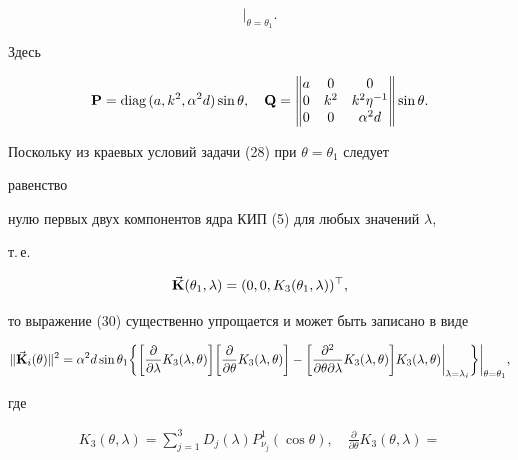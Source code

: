 \begin{exam}
\begin{equation}
\bigg|_{\theta=\theta_1}. 


\end{equation} 


Здесь 


$$ 


\bold P=\text{diag\,}(a,k^2,\alpha^2d)\sin\theta,\quad 


\bold Q= 


\begin{Vmatrix} 


a & 0 & 0 \\ 0 & k^2 & k^2\eta^{-1} \\ 0 & 0 & \alpha^2d 


\end{Vmatrix} 


\sin\theta. 


$$ 


Поскольку из краевых условий задачи (28) при $\theta=\theta_1$ следует 


равенство 


нулю первых двух компонентов ядра КИП (5) для любых значений $\lambda$, 


т.\,е. 


$$


\vb{K}(\theta_1,\lambda)=(0,0,K_3(\theta_1,\lambda))^\top, 


$$ 


то выражение (30) существенно упрощается и может быть записано в виде 


\begin{equation} 


\|\vb{K}_i(\theta)\|^2=\alpha^2d\sin\theta_1\bigg\{ 


\bigg[\frac{\partial}{\partial\lambda}K_3(\lambda,\theta)\bigg] 


\bigg[\frac{\partial}{\partial\theta}K_3(\lambda,\theta)\bigg]- 


\bigg[\frac{\partial^2}{\partial\theta\partial\lambda} 


K_3(\lambda,\theta)\bigg]K_3(\lambda,\theta)\bigg|_{\lambda=\lambda_i} 


\bigg\}\bigg|_{\theta=\theta_1}, 


\end{equation} 


где 


\begin{gather} 


K_3(\theta,\lambda)=\sum^3_{j=1}D_j(\lambda)P^1_{\nu_j}(\cos\theta), 


\quad \frac{\partial}{\partial\theta}K_3(\theta,\lambda)= 



\end{gather}
\end{exam}
